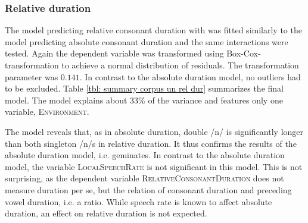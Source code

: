 \subsubsection{Relative duration}


The model predicting relative consonant duration with  was fitted similarly to the model predicting absolute consonant duration and the same interactions were tested. Again the dependent variable was transformed using Box-Cox- transformation to achieve a normal distribution of residuals. The transformation parameter was $0.141$. In contrast to the absolute duration model, no outliers had to be excluded. 
 Table \ref{tbl: summary corpus un rel dur} summarizes the final model. The model explains about 33\% of the variance and features only one variable, \textsc{Environment}.



\begin{table}[h!]
	\caption{ Summary of linear model for variables predicting the Box-Cox-transformed relative duration of [n] in prefixed words}
	\label{tbl: summary corpus un rel dur}
	\begin{center}
		
	\end{center}
\end{table}



The model reveals that, as in absolute duration, double /n/ is significantly longer than both singleton /n/s in relative duration. It thus confirms the results of the absolute duration model, i.e.  geminates. In contrast to the absolute duration model, the variable \textsc{LocalSpeechRate} is not significant in this model. This is not surprising, as the dependent variable \textsc{RelativeConsonantDuration} does not measure duration per se, but the relation of consonant duration and preceding vowel duration, i.e. a ratio. While speech rate is known to affect absolute duration, an effect on relative duration is not expected. 

